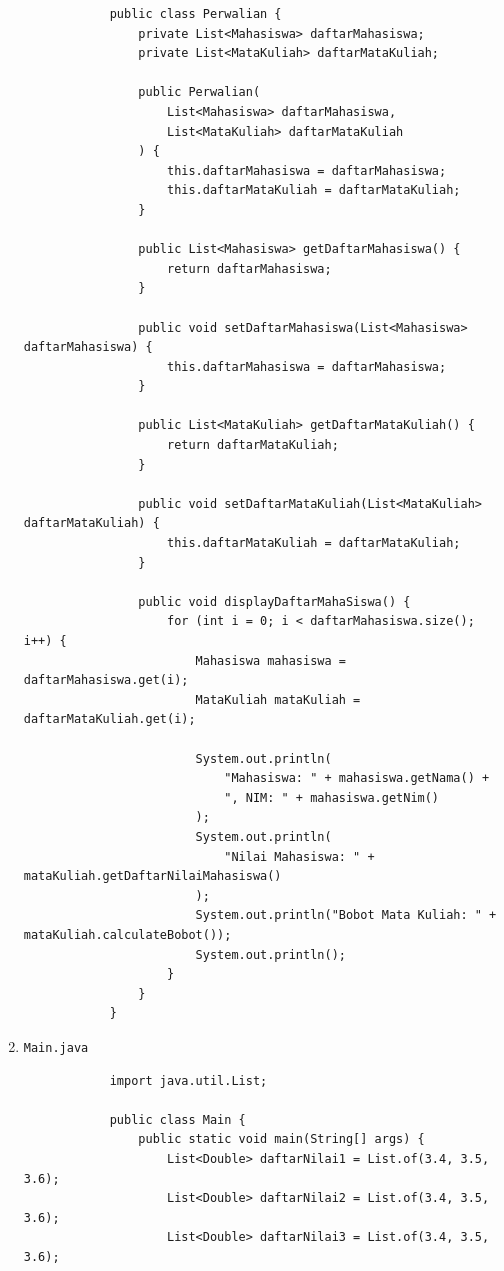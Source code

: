 \documentclass[12pt,titlepage]{article}
\begin{document}
\begin{enumerate}
{\begin{verbatim}
            public class Perwalian {
                private List<Mahasiswa> daftarMahasiswa;
                private List<MataKuliah> daftarMataKuliah;

                public Perwalian(
                    List<Mahasiswa> daftarMahasiswa,
                    List<MataKuliah> daftarMataKuliah
                ) {
                    this.daftarMahasiswa = daftarMahasiswa;
                    this.daftarMataKuliah = daftarMataKuliah;
                }

                public List<Mahasiswa> getDaftarMahasiswa() {
                    return daftarMahasiswa;
                }

                public void setDaftarMahasiswa(List<Mahasiswa> daftarMahasiswa) {
                    this.daftarMahasiswa = daftarMahasiswa;
                }

                public List<MataKuliah> getDaftarMataKuliah() {
                    return daftarMataKuliah;
                }

                public void setDaftarMataKuliah(List<MataKuliah> daftarMataKuliah) {
                    this.daftarMataKuliah = daftarMataKuliah;
                }

                public void displayDaftarMahaSiswa() {
                    for (int i = 0; i < daftarMahasiswa.size(); i++) {
                        Mahasiswa mahasiswa = daftarMahasiswa.get(i);
                        MataKuliah mataKuliah = daftarMataKuliah.get(i);

                        System.out.println(
                            "Mahasiswa: " + mahasiswa.getNama() + 
                            ", NIM: " + mahasiswa.getNim()
                        );
                        System.out.println(
                            "Nilai Mahasiswa: " + mataKuliah.getDaftarNilaiMahasiswa()
                        );
                        System.out.println("Bobot Mata Kuliah: " + mataKuliah.calculateBobot());
                        System.out.println();
                    }
                }
            }
        \end{verbatim}
    }
    \item {
        \texttt{Main.java}
        \begin{verbatim}
            import java.util.List;

            public class Main {
                public static void main(String[] args) {
                    List<Double> daftarNilai1 = List.of(3.4, 3.5, 3.6);
                    List<Double> daftarNilai2 = List.of(3.4, 3.5, 3.6);
                    List<Double> daftarNilai3 = List.of(3.4, 3.5, 3.6);


\end{verbatim}}
\end{enumerate}
\end{document}
